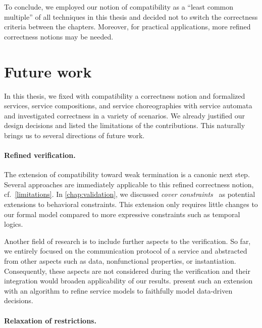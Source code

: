 \bigskip

To conclude, we employed our notion of compatibility as a ``least common multiple'' of all techniques in this thesis and decided not to switch the correctness criteria between the chapters. Moreover, for practical applications, more refined correctness notions may be needed.





\section{Future work}

In this thesis, we fixed with compatibility a correctness notion and formalized services, service compositions, and service choreographies with service automata and investigated correctness in a variety of scenarios. We already justified our design decisions and listed the limitations of the contributions. This naturally brings us to several directions of future work.


\paragraph{Refined verification.}

The extension of compatibility toward weak termination is a canonic next step. Several approaches are immediately applicable to this refined correctness notion, cf.~\autoref{limitations}. In \autoref{chap:validation}, we discussed \emph{cover constraints}~\cite{StahlW_2008_bpm} as potential extensions to behavioral constraints. This extension only requires little changes to our formal model compared to more expressive constraints such as temporal logics.

Another field of research is to include further aspects to the verification. So far, we entirely focused on the communication protocol of a service and abstracted from other aspects such as data, nonfunctional properties, or instantiation. Consequently, these aspects are not considered during the verification and their integration would broaden applicability of our results. \citet{HeinzeAM_2009_bpm} present such an extension with an algorithm to refine service models to faithfully model data-driven decisions.


\paragraph{Relaxation of restrictions.}

